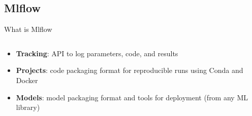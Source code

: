\documentclass[10pt,aspectratio=169]{beamer}
\begin{document}
\subsection{Mlflow}
\begin{frame}{What is Mlflow}
    \begin{columns}[c]
    \begin{column}{.3\textwidth} %
    \begin{minipage}{1\textwidth}
    \begin{itemize}
        \item<1>\textbf{Tracking}: API to log parameters, code, and results
        \item<2>\textbf{Projects}: code packaging format for reproducible runs using Conda and Docker
        \item<3>\textbf{Models}: model packaging format and tools for deployment (from any ML library)
    \end{itemize}
    \end{minipage}
    \end{column}
    \begin{column}{.7\textwidth} %
\end{column}
\end{columns}
\end{frame}
\end{document}
